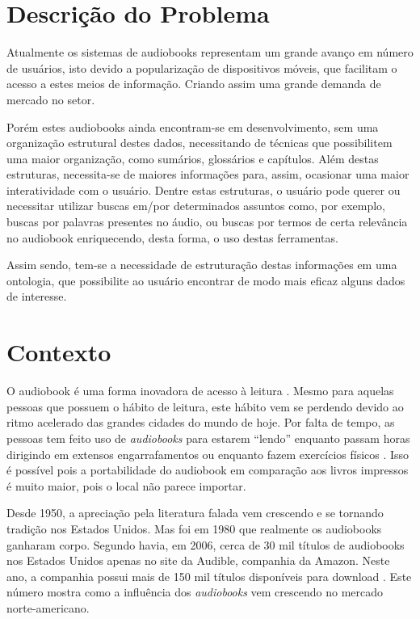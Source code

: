 \section{Descrição do Problema}

Atualmente os sistemas de audiobooks representam um grande avanço em número de usuários, isto devido a popularização de dispositivos móveis, que facilitam o acesso a estes meios de informação. Criando assim uma grande demanda de mercado no setor.

Porém estes audiobooks ainda encontram-se em desenvolvimento, sem uma organização estrutural destes dados, necessitando de técnicas que possibilitem uma maior organização, como sumários, glossários e capítulos. Além destas estruturas, necessita-se de maiores informações para, assim, ocasionar uma maior interatividade com o usuário. Dentre estas estruturas, o usuário pode querer ou necessitar utilizar buscas em/por determinados assuntos como, por exemplo, buscas por palavras presentes no áudio, ou buscas por termos de certa relevância no audiobook enriquecendo, desta forma, o uso destas ferramentas.

Assim sendo, tem-se a necessidade de estruturação destas informações em uma ontologia, que possibilite ao usuário encontrar de modo mais eficaz alguns dados de interesse. 

\section{Contexto}

O audiobook é uma forma inovadora de acesso à leitura \cite{audiobooksuporte}. Mesmo para aquelas pessoas que possuem o hábito de leitura, este hábito vem se perdendo devido ao ritmo acelerado das grandes cidades do mundo de hoje. Por falta de tempo, as pessoas tem feito uso de \textit{audiobooks} para estarem ``lendo'' enquanto passam horas dirigindo em extensos engarrafamentos ou enquanto fazem exercícios físicos \cite{audiobookinovacao}. Isso é possível pois a portabilidade do audiobook em comparação aos livros impressos é muito maior, pois o local não parece importar.

Desde 1950, a apreciação pela literatura falada vem crescendo e se tornando tradição nos Estados Unidos. Mas foi em 1980 que realmente os audiobooks ganharam corpo. Segundo \cite{teixeira} havia, em 2006, cerca de 30 mil títulos de audiobooks nos Estados Unidos apenas no site da Audible, companhia da Amazon. Neste ano, a companhia possui mais de 150 mil títulos disponíveis para download \cite{audible}. Este número mostra como a influência dos \textit{audiobooks} vem crescendo no mercado norte-americano.

